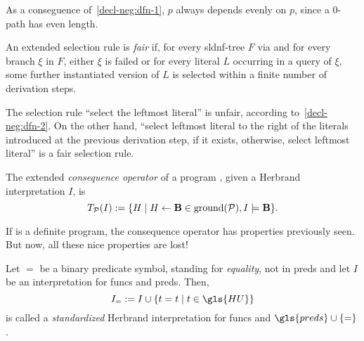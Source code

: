 \begin{rem}
    As a conseguence of~\cref{decl-neg:dfn-1}, \(p\) always depends evenly on \(p\), since a \(0\)-path has even length.
\end{rem}

\begin{dfn}[fairness]
    \label{decl-neg:dfn-2}
    An extended selection rule  is \emph{fair} if, for every \gls{sldnf}-tree \(F\) via  and for every branch \(\xi\) in \(F\), either \(\xi\) is failed or for every literal \(L\) occurring in a query of \(\xi\), some further instantiated version of \(L\) is selected within a finite number of derivation steps.
\end{dfn}

\begin{exa}
    The selection rule ``select the leftmost literal'' is unfair, according to~\cref{decl-neg:dfn-2}.
    On the other hand, ``select leftmost literal to the right of the literals introduced at the previous derivation step, if it exists, otherwise, select leftmost literal'' is a fair selection rule.
\end{exa}

\begin{dfn}
    The extended \emph{consequence operator} of a program \prog, given a Herbrand interpretation \(I\), is
    \begin{equation*}
        T_\mathcal{P}(I) := \lbrace H \mid H \leftarrow \mathbf{B} \in \operatorname{ground}(\mathcal{P}), I \models \mathbf{B} \rbrace.
    \end{equation*}
\end{dfn}

\begin{rem}
    If \prog is a definite program, the consequence operator has properties previously seen.
    But now, all these nice properties are lost!
\end{rem}

\begin{dfn}
    Let \(=\) be a binary predicate symbol, standing for \emph{equality}, not in \gls{preds} and let \(I\) be an interpretation for \gls{funcs} and \gls{preds}.
    Then,
    \begin{equation*}
        I_= := I \cup \lbrace t = t \mid t \in \gls{HU}\rbrace
    \end{equation*}
    is called a \emph{standardized} Herbrand interpretation for \gls{funcs} and \(\gls{preds} \cup \lbrace = \rbrace\).
\end{dfn}

